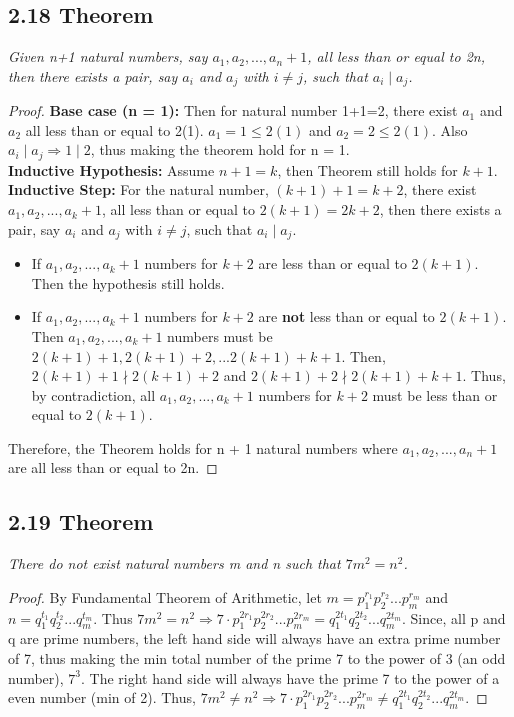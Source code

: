 \documentclass{article}
\begin{document}
\subsection*{2.18 Theorem} 
\quad \textit{Given n+1 natural numbers, say $a_1,a_2,...,a_n+1$, all less than or equal to 2n, then there exists a pair, say $a_i$ and $a_j$ with $i \neq j$, such that $a_i \mid a_j$.}

\begin{proof}
\textbf{Base case (n = 1):  }
    Then for natural number 1+1=2, there exist $a_1$ and $a_2$ all less than or equal to 2(1). $a_1 = 1 \leq 2(1)$ and $a_2 = 2 \leq 2(1)$. Also $a_i \mid a_j \Longrightarrow 1 \mid 2$, thus making the theorem hold for n = 1.\\
\textbf{Inductive Hypothesis: } Assume $n + 1 = k$, then Theorem still holds for $k + 1$.\\ 
\textbf{Inductive Step: }
    For the natural number, $(k+1)+1 = k + 2$, there exist $a_1,a_2,...,a_k+1$, all less than or equal to $2(k+1) = 2k + 2$, then there exists a pair, say $a_i$ and $a_j$ with $i \neq j$, such that $a_i \mid a_j$.
    \begin{itemize}
        \item If $a_1,a_2,...,a_k+1$ numbers for $k+2$ are less than or equal to $2(k+1)$. Then the hypothesis still holds.
        \item If $a_1,a_2,...,a_k+1$ numbers for $k+2$ are \textbf{not} less than or equal to $2(k+1)$. Then $a_1,a_2,...,a_k+1$ numbers must be $2(k+1)+1, 2(k+1)+2,...2(k+1)+k+1$. Then, $2(k+1)+1 \nmid 2(k+1)+2$ and $2(k+1)+2 \nmid 2(k+1)+k+1$. Thus, by contradiction, all $a_1,a_2,...,a_k+1$ numbers for $k+2$ must be less than or equal to $2(k+1)$.
    \end{itemize}
    Therefore, the Theorem holds for n + 1 natural numbers where $a_1,a_2,...,a_n+1$ are all less than or equal to 2n.
\end{proof}

\subsection*{2.19 Theorem} 
\quad \textit{There do not exist natural numbers m and n such that $7m^2 = n^2$.}

\begin{proof}
By Fundamental Theorem of Arithmetic, let $m = p_{1}^{r_1}p_{2}^{r_2}...p_{m}^{r_m}$ and $n = q_{1}^{t_1}q_{2}^{t_2}...q_{m}^{t_m}$. Thus $7m^2 = n^2 \Longrightarrow 7 \cdot p_{1}^{2r_1}p_{2}^{2r_2}...p_{m}^{2r_m} = q_{1}^{2t_1}q_{2}^{2t_2}...q_{m}^{2t_m}$. Since, all p and q are prime numbers, the left hand side will always have an extra prime number of 7, thus making the min total number of the prime 7 to the power of 3 (an odd number), $7^3$. The right hand side will always have the prime 7 to the power of a even number (min of 2). Thus, $7m^2 \neq n^2 \Longrightarrow 7 \cdot p_{1}^{2r_1}p_{2}^{2r_2}...p_{m}^{2r_m} \neq q_{1}^{2t_1}q_{2}^{2t_2}...q_{m}^{2t_m}$.
\end{proof}
\end{document}
